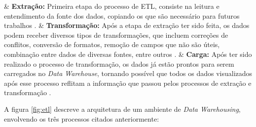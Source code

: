 \begin{easylist}[itemize]

	& \textbf{Extração: } Primeira etapa do processo de ETL, consiste na leitura e entendimento da fonte 		dos dados, copiando os que são necessário para futuros trabalhos \cite{Kimball2002}.  
	& \textbf{Transformação: } Após a etapa de extração ter sido feita, os dados podem receber diversos tipos de transformações, que incluem correções de conflitos, conversão de formatos, remoção de campos que não são úteis, combinação entre dados de diversas fontes, entre outros \cite{Kimball2002}.
	& \textbf{Carga: } Após ter sido realizado o processo de transformação, os dados já estão prontos para serem carregados no \textit{Data Warehouse}, tornando possível que todos os dados visualizados após esse processo reflitam a informação que passou pelos processos de extração e transformação \cite{neeraj_sharma_2011}.  

	\end{easylist}

A figura \ref{fig:etl} descreve a arquitetura de um ambiente de \textit{Data Warehousing}, envolvendo os três processos citados anteriormente:

